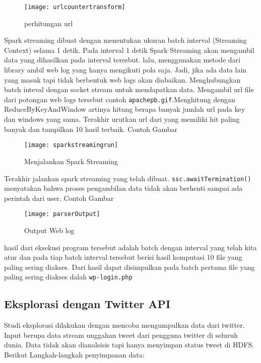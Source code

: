 \begin{figure}[H] 
	\centering  
	\texttt{[image: urlcountertransform]}  
	\caption[Gambar perhitungan url]{perhitungan url} 
	\label{fig:Output-Log-Parser} 
\end{figure}

Spark streaming dibuat dengan menentukan ukuran batch interval (Streaming Context) selama 1 detik. Pada interval 1 detik Spark Streaming akan mengambil data yang dihasilkan pada interval teresbut. lalu, menggunakan metode dari library ambil web log yang hanya mengikuti pola saja. Jadi, jika ada data lain yang masuk tapi tidak berbentuk web logs akan diabaikan. Menghubungkan batch inteval dengan socket stream untuk mendapatkan data. Mengambil url file dari potongan web logs tersebut contoh \texttt{apachepb.gif}.Menghitung dengan ReduceByKeyAndWindow artinya hitung berapa banyak jumlah url pada key dan windows yang sama. Terakhir urutkan url dari yang memiliki hit paling banyak dan tampilkan 10 hasil terbaik. Contoh Gambar

\begin{figure}[H] 
	\centering  
	\texttt{[image: sparkstreamingrun]}  
	\caption[Gambar File input]{Menjalankan Spark Streaming} 
	\label{fig:Output-Log-Parser} 
\end{figure}

Terakhir jalankan spark streaming yang telah dibuat. \texttt{ssc.awaitTermination()} menyatakan bahwa proses pengambilan data tidak akan berhenti sampai ada perintah dari user. Contoh Gambar



\begin{figure}[H] 
	\centering  
	\texttt{[image: parserOutput]}  
	\caption[Gambar Output Web Log]{Output Web log} 
	\label{fig:Output-Log-Parser} 
\end{figure}

hasil dari eksekusi program tersebut adalah batch dengan interval yang telah kita atur dan pada tiap batch interval tersebut berisi hasil komputasi 10 file yang paling sering diakses. Dari hasil dapat disimpulkan pada batch pertama file yang paling sering diakses dalah \texttt{wp-login.php}

\subsection{Eksplorasi dengan Twitter API}
Studi eksplorasi dilakukan dengan mencoba mengumpulkan data dari twitter. Input berupa data stream unggahan tweet dari pengguna twitter di seluruh dunia. Data tidak akan dianalsisis tapi hanya menyimpan status tweet di HDFS. Berikut Langkah-langkah penyimpanan data:

